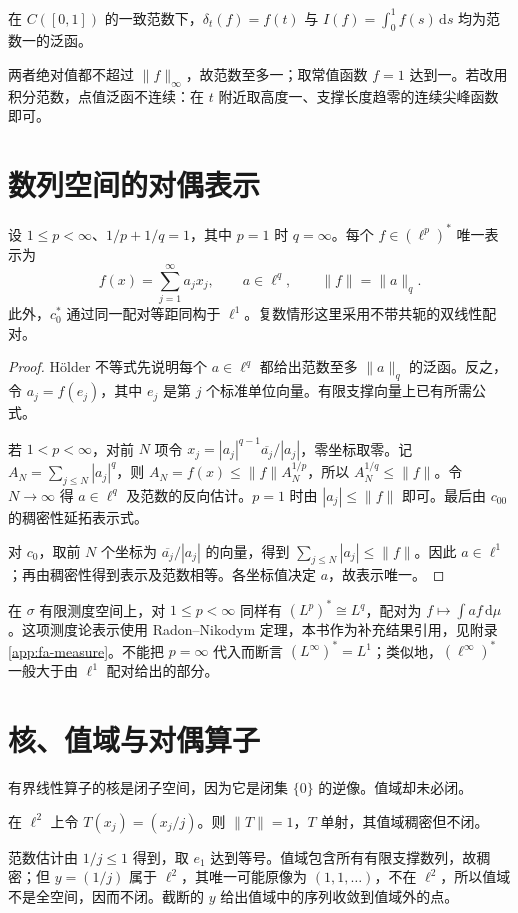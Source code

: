 \begin{example}[点值与积分]
在 $C([0,1])$ 的一致范数下，$\delta_t(f)=f(t)$ 与 $I(f)=\int_0^1f(s)\,\mathrm ds$ 均为范数一的泛函。
\end{example}
\begin{solve}
两者绝对值都不超过 $\|f\|_\infty$，故范数至多一；取常值函数 $f=1$ 达到一。若改用积分范数，点值泛函不连续：在 $t$ 附近取高度一、支撑长度趋零的连续尖峰函数即可。
\end{solve}

\section{数列空间的对偶表示}
\begin{theorem}\label{thm:fa-sequence-dual}
设 $1\leq p<\infty$、$1/p+1/q=1$，其中 $p=1$ 时 $q=\infty$。每个 $f\in(\ell^p)^*$ 唯一表示为
\[
 f(x)=\sum_{j=1}^{\infty}a_jx_j,\qquad a\in\ell^q,
 \qquad\|f\|=\|a\|_q.
\]
此外，$c_0^*$ 通过同一配对等距同构于 $\ell^1$。复数情形这里采用不带共轭的双线性配对。
\end{theorem}
\begin{proof}
Hölder 不等式先说明每个 $a\in\ell^q$ 都给出范数至多 $\|a\|_q$ 的泛函。反之，令 $a_j=f(e_j)$，其中 $e_j$ 是第 $j$ 个标准单位向量。有限支撑向量上已有所需公式。

若 $1<p<\infty$，对前 $N$ 项令 $x_j=|a_j|^{q-1}\overline{a_j}/|a_j|$，零坐标取零。记 $A_N=\sum_{j\leq N}|a_j|^q$，则 $A_N=f(x)\leq\|f\|A_N^{1/p}$，所以 $A_N^{1/q}\leq\|f\|$。令 $N\to\infty$ 得 $a\in\ell^q$ 及范数的反向估计。$p=1$ 时由 $|a_j|\leq\|f\|$ 即可。最后由 $c_{00}$ 的稠密性延拓表示式。

对 $c_0$，取前 $N$ 个坐标为 $\overline{a_j}/|a_j|$ 的向量，得到 $\sum_{j\leq N}|a_j|\leq\|f\|$。因此 $a\in\ell^1$；再由稠密性得到表示及范数相等。各坐标值决定 $a$，故表示唯一。
\end{proof}
在 $\sigma$ 有限测度空间上，对 $1\leq p<\infty$ 同样有 $(L^p)^*\cong L^q$，配对为 $f\mapsto\int af\,\mathrm d\mu$。这项测度论表示使用 Radon--Nikodym 定理，本书作为补充结果引用，见附录\ref{app:fa-measure}。不能把 $p=\infty$ 代入而断言 $(L^\infty)^*=L^1$；类似地，$(\ell^\infty)^*$ 一般大于由 $\ell^1$ 配对给出的部分。

\section{核、值域与对偶算子}
有界线性算子的核是闭子空间，因为它是闭集 $\{0\}$ 的逆像。值域却未必闭。
\begin{example}\label{ex:fa-diagonal-range}
在 $\ell^2$ 上令 $T(x_j)=(x_j/j)$。则 $\|T\|=1$，$T$ 单射，其值域稠密但不闭。
\end{example}
\begin{solve}
范数估计由 $1/j\leq1$ 得到，取 $e_1$ 达到等号。值域包含所有有限支撑数列，故稠密；但 $y=(1/j)$ 属于 $\ell^2$，其唯一可能原像为 $(1,1,\ldots)$，不在 $\ell^2$，所以值域不是全空间，因而不闭。截断的 $y$ 给出值域中的序列收敛到值域外的点。
\end{solve}

